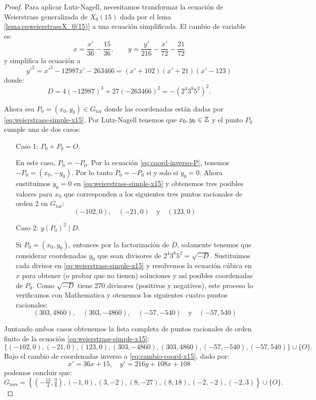 \begin{proof}
Para aplicar Lutz-Nagell, necesitamos transformar la ecuación de Weierstrass generalizada de $X_0(15)$ dada por el lema \ref{lema:eqweierstrassX_0(15)} a una ecuación simplificada. El cambio de variable es:
\begin{equation}\label{eq:cambio-coord-x15}
	x=\frac{x'}{36}-\frac{15}{36},\qquad y=\frac{y'}{216}-\frac{x'}{72}-\frac{21}{72}
\end{equation}
y simplifica la ecuación a
\begin{equation}\label{eq:weierstrass-simple-x15}
	y'^2=x'^3-12987x'-263466=(x'+102)(x'+21)(x'-123)
\end{equation}
donde:
\[
	D=4(-12987)^3+27(-263466)^2=-(2^4 3^8 5^2)^2.
\]

Ahora sea $P_0=(x_0,y_0)\in G_\mathrm{tor}$ donde las coordenadas están dadas por \eqref{eq:weierstrass-simple-x15}. Por Lutz-Nagell tenemos que $x_0,y_0\in\mathbb{Z}$ y el punto $P_0$ cumple una de dos casos:
\begin{enumerate}
	\item[Caso 1:] $P_0+P_0=O$.
	
	En este caso, $P_0=-P_0$. Por la ecuaci\'on \eqref{eq:coord-inverso-P}, tenemos $-P_0=(x_0,-y_0)$. Por lo tanto $P_0=-P_0$ si y solo si $y_0=0$. Ahora sustituimos $y_0=0$ en \eqref{eq:weierstrass-simple-x15} y obtenemos tres posibles valores para $x_0$ que corresponden a los siguientes tres puntos racionales de orden 2 en $G_\mathrm{tor}$:
\[
	(-102,0),\quad (-21,0)\quad\text{y}\quad (123,0)
\]
	\item[Caso 2:] $y(P_0)^2\mid D$.
	
	Si $P_0=(x_0,y_0)$, entonces por la factorización de $D$, solamente tenemos que considerar coordenadas $y_0$ que sean divisores de $2^4 3^8 5^2=\sqrt{-D}$. Sustituimos cada divisor en \eqref{eq:weierstrass-simple-x15} y resolvemos la ecuación cúbica en $x$ para obtener (o probar que no tienen) soluciones y así posibles coordenadas de $P_0$. Como $\sqrt{-D}$ tiene 270 divisores (positivos y negativos), este proceso lo verificamos con Mathematica y otenemos los siguientes cuatro puntos racionales:
	\[
		(303,4860),\quad (303,-4860),\quad (-57,-540)\quad\text{y}\quad (-57,540)
	\]
\end{enumerate}

Juntando ambos casos obtenemos la lista completa de puntos racionales de orden finito de la ecuación \eqref{eq:weierstrass-simple-x15}:
\[
	\{(-102,0),(-21,0),(123,0),(303,-4860),(303,4860),(-57,-540),(-57,540)\}\cup\{O\}.
\]
Bajo el cambio de coordenadas inverso a \eqref{eq:cambio-coord-x15}, dado por:
\[
	x'=36x+15,\quad y'=216y+108x+108
\]
podemos concluir que:
	\[
		G_\mathrm{tors}=
		\left\{ \left(-\tfrac{13}{4},\tfrac{9}{8}\right),(-1,0),(3,-2),(8,-27),(8,18),(-2,-2),(-2,3) \right\}\cup\{O\}.
	\]
\end{proof}

